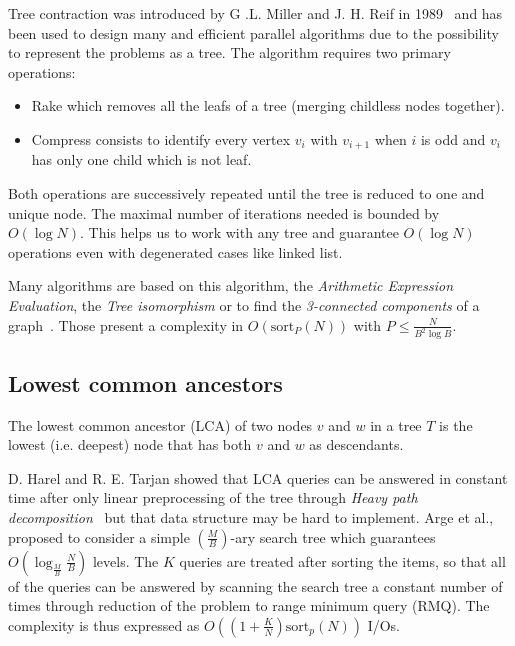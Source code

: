 Tree contraction was introduced by G .L. Miller and J. H. Reif in 1989~\cite{miller1989parallel} and has been used to design many and efficient parallel algorithms due to the possibility to represent the problems as a tree. The algorithm requires two primary operations:

\begin{itemize}
    \item Rake which removes all the leafs of a tree (merging childless nodes together).
    \item Compress consists to identify every vertex $v_{i}$ with $v_{i+1}$ when $i$ is odd and $v_{i}$ has only one child which is not leaf.
\end{itemize}

Both operations are successively repeated until the tree is reduced to one and unique node. The maximal number of iterations needed is bounded by $O(\log N)$. This helps us to work with any tree and guarantee $O(\log N)$ operations even with degenerated cases like linked list.

Many algorithms are based on this algorithm, the \textit{Arithmetic Expression Evaluation}, the \textit{Tree isomorphism} or to find the \textit{3-connected components} of a graph~\cite{miller1991parallel}. Those present a complexity in $O(\text{sort}_{P}(N))$ with $P \leq \frac{N}{B^{2} \log B}$.

\subsection{Lowest common ancestors}

The lowest common ancestor (LCA) of two nodes $v$ and $w$ in a tree $T$ is the lowest (i.e. deepest) node that has both $v$ and $w$ as descendants.

D. Harel and R. E. Tarjan showed that LCA queries can be answered in constant time after only linear preprocessing of the tree through \textit{Heavy path decomposition}~\cite{harel1984fast} but that data structure may be hard to implement. Arge et al., proposed to consider a simple $(\frac{M}{B})$-ary search tree which guarantees $O(\log_{\frac{M}{B}} \frac{N}{B})$ levels. The $K$ queries are treated after sorting the items, so that all of the queries can be answered by scanning the search tree a constant number of times through reduction of the problem to range minimum query (RMQ). The complexity is thus expressed as $O((1 + \frac{K}{N}) \text{sort}_{p}(N))$ I/Os.

